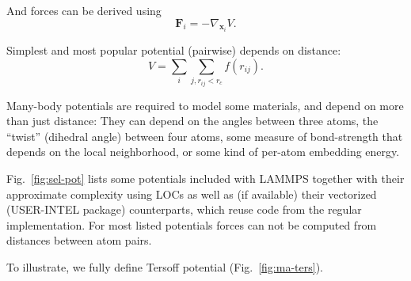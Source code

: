 \documentclass[sigconf]{acmart}
\begin{document}
And forces can be derived using
$$\mathbf{F}_i = -\nabla_{\mathbf{x}_i} V.$$

Simplest and most popular potential (pairwise) depends on distance:
$$V=\sum_i\sum_{j, r_{ij} < r_c} f(r_{ij}).$$

Many-body potentials are required to model some materials, and depend on more than just distance:
They can depend on the angles between three atoms, the ``twist'' (dihedral angle) between four atoms, some measure of bond-strength that depends on the local neighborhood, or some kind of per-atom embedding energy.

Fig.~\ref{fig:sel-pot} lists some potentials included with LAMMPS together with their approximate complexity using LOCs as well as (if available) their vectorized (USER-INTEL package) counterparts, which reuse code from the regular implementation.
For most listed potentials forces can not be computed from distances between atom pairs.

To illustrate, we fully define Tersoff potential (Fig.~\ref{fig:ma-ters}).
\end{document}
